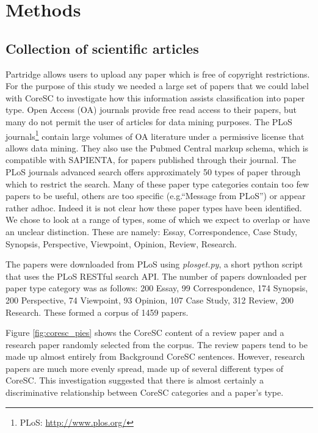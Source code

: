 \documentclass{svmult}
\begin{document}
\section{Methods}
\label{sec:2}


\subsection*{Collection of scientific articles} Partridge allows users to
upload any paper which is free of copyright restrictions.  For the purpose of
this study we needed a large set of papers that we could label with CoreSC to
investigate how this information assists classification into paper type.  Open
Access (OA) journals provide free read access to their papers, but many do not
permit the user of articles for data mining purposes.  The PLoS
journals\footnote{PLoS: \url{http://www.plos.org/}} contain large volumes of OA
literature under a permissive license that allows data mining.  They also use
the Pubmed Central markup schema, which is compatible with SAPIENTA, for papers
published through their journal.  The PLoS journals advanced search offers
approximately 50 types of paper through which to restrict the search.  Many of
these paper type categories contain too few papers to be useful, others are too
specific (e.g.``Message from PLoS'') or appear rather adhoc.  Indeed it is not
clear how these paper types have been identified. We chose to look at a range
of types, some of which we expect to overlap or have an unclear distinction.
These are namely: Essay, Correspondence, Case Study, Synopsis, Perspective,
Viewpoint, Opinion, Review, Research. 


The papers were downloaded from PLoS using {\em plosget.py}, a short python
script that uses the PLoS RESTful search API. The number of papers downloaded
per paper type category was as follows: 200 Essay, 99 Correspondence, 174
Synopsis, 200 Perspective, 74 Viewpoint, 93 Opinion, 107 Case Study, 312
Review, 200 Research.  These formed a corpus of 1459 papers.

Figure \ref{fig:coresc_pies} shows the CoreSC content of a review paper and a
research paper randomly selected from the corpus.  The review papers tend to be
made up almost entirely from Background CoreSC sentences.  However, research
papers are much more evenly spread, made up of several different types of
CoreSC.  This investigation suggested that there is almost certainly a
discriminative relationship between CoreSC categories and a paper's type. 
\end{document}
